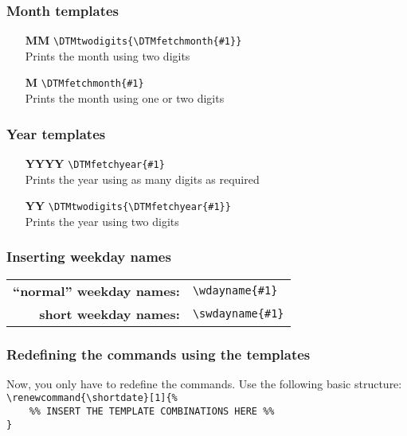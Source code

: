 \documentclass[11pt]{ltxdoc}
\begin{document}
	\subsubsection*{Month templates}
	\begin{itemize}
		\item[\sffamily\bfseries MM]
		\verb|\DTMtwodigits{\DTMfetchmonth{#1}}| \\
		Prints the month using two digits

		\item[\sffamily\bfseries M]
		\verb|\DTMfetchmonth{#1}| \\
		Prints the month using one or two digits
	\end{itemize}
	
	\subsubsection*{Year templates}
	\begin{itemize}
		\item[\sffamily\bfseries YYYY]
		\verb|\DTMfetchyear{#1}| \\
		Prints the year using as many digits as required
		
		\item[\sffamily\bfseries YY]
		\verb|\DTMtwodigits{\DTMfetchyear{#1}}| \\
		Prints the year using two digits
	\end{itemize}
	
	\subsubsection*{Inserting weekday names}
	\begin{tabular}{>{\sffamily\bfseries}rl}
		\enquote{normal} weekday names: & \verb|\wdayname{#1}|  \\
		           short weekday names: & \verb|\swdayname{#1}|
	\end{tabular}
	
	\subsubsection*{Redefining the commands using the templates}
	Now, you only have to redefine the commands. Use the following basic structure: \\
	\verb|\renewcommand{\shortdate}[1]{%| \\
	\verb|    %% INSERT THE TEMPLATE COMBINATIONS HERE %%| \\
	\verb|}|
	
\end{document}
